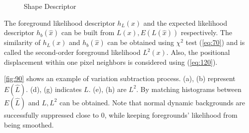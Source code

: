 \documentclass[conference]{IEEEtran}
\begin{document}
\begin{figure}[!t]
  \centering
  \label{fig:80}
  \hfill
  \caption{Shape Descriptor}
\end{figure}

The foreground likelihood descriptor \begin{math} h_L(x) \end{math} and the expected likelihood descriptor \begin{math} h_b(\hat{x}) \end{math} can be built from \begin{math} L(x), E(L(\hat{x})) \end{math} respectively. The similarity of \begin{math} h_L(x) \end{math}  and \begin{math} h_b(\hat{x}) \end{math} can be obtained using \begin{math} \chi ^2 \end{math} test (\ref{eq:70}) and is called the second-order foreground likelihood \begin{math} L^2(x) \end{math}. Also, the positional displacement within one pixel neighbors is considered using (\ref{eq:120}).

\ref{fig:90} shows an example of variation subtraction process. (a), (b) represent \begin{math} E(\hat{L}) \end{math}. (d), (g) indicates \begin{math} L \end{math}. (e), (h) are \begin{math} L^2 \end{math}. By matching histograms between \begin{math} E(\hat{L}) \end{math} and \begin{math} L, L^2 \end{math} can be obtained. Note that normal dynamic backgrounds are successfully suppressed close to 0, while keeping foregrounds' likelihood from being smoothed.
\end{document}
